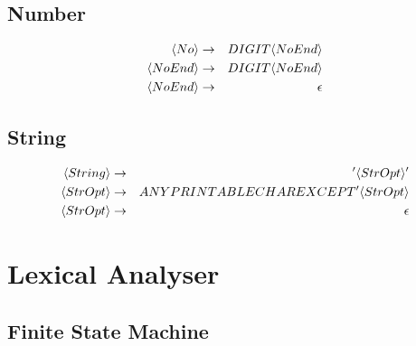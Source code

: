 \documentclass[a4paper,12pt]{article}
\newcommand{\nonterminal}[1]{\langle #1 \rangle}
\begin{document}
\subsection*{Number}
                            
\begin{eqnarray}
\setcounter{equation}{1}
\nonterminal{No} 			&	\to	&	 DIGIT \nonterminal{NoEnd}	\\
\nonterminal{NoEnd} 		&	\to	&	 DIGIT \nonterminal{NoEnd}	\\
\nonterminal{NoEnd} 		&	\to	&	 \epsilon
\end{eqnarray}

\subsection*{String}
                            
\begin{eqnarray}
\setcounter{equation}{1}
\nonterminal{String} 	&	\to	&	 ' \nonterminal{StrOpt} '	\\
\nonterminal{StrOpt} 	&	\to	&	 ANY PRINTABLE CHAR EXCEPT ' \nonterminal{StrOpt}	\\
\nonterminal{StrOpt} 	&	\to	&	 \epsilon
\end{eqnarray}

\section{Lexical Analyser}

\subsection*{Finite State Machine}

\end{document}
